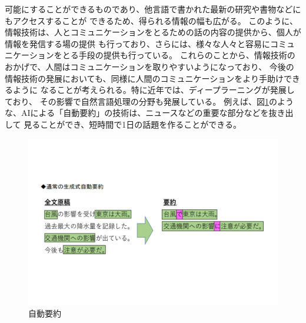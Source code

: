 \documentclass[dvipdfmx]{jsarticle}
\begin{document}
\begin{itemize}
\begin{itemize}
    可能にすることができるものであり、他言語で書かれた最新の研究や書物などにもアクセスすることが
    できるため、得られる情報の幅も広がる。
    このように、情報技術は、人とコミュニケーションをとるための話の内容の提供から、個人が情報を発信する場の提供
    も行っており、さらには、様々な人々と容易にコミュニケーションをとる手段の提供も行っている。
    これらのことから、情報技術のおかげで、人間はコミュニケーションを取りやすいようになっており、
    今後の情報技術の発展においても、同様に人間のコミュニケーションをより手助けできるように
    なることが考えられる。特に近年では、ディープラーニングが発展しており、
    その影響で自然言語処理の分野も発展している。
    例えば、図\ref{graph:1}のような、AIによる「自動要約」の技術は、ニュースなどの重要な部分などを抜き出して
    見ることができ、短時間で1日の話題を作ることができる。
  \end{itemize}
\end{itemize}
\begin{figure}[b]
  \centering
  \includegraphics[keepaspectratio, scale=0.19]{003.jpg}
  \caption{自動要約}
  \label{graph:1}
\end{figure}
\end{document}
